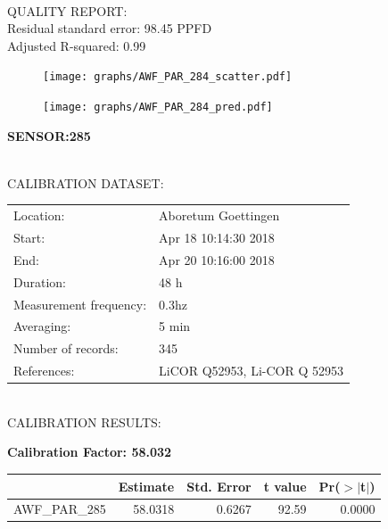 \documentclass[oneside]{report}
\begin{document}
\hrulefill\\
QUALITY REPORT:\\
Residual standard error: 98.45 PPFD\\
Adjusted R-squared: 0.99



\begin{figure}[H]
  \centering
  \texttt{[image: graphs/AWF\_PAR\_284\_scatter.pdf]}
\end{figure}




\begin{figure}[H]
  \centering
  \texttt{[image: graphs/AWF\_PAR\_284\_pred.pdf]}
\end{figure}

\pagebreak


\begin{center}
\large{\textbf{SENSOR:285}}\\
\end{center}

\hrulefill\\
CALIBRATION DATASET:\\
\begin{table}[h!]
  \centering
  \label{tab:table1}
  \begin{tabular}{ll}
    Location: & Aboretum Goettingen\\ 
    
    
    Start:  & Apr 18 10:14:30 2018 \\
    End:   & Apr 20 10:16:00 2018\\ 
    Duration: & 48 h\\
    Measurement frequency: & 0.3hz\\
    Averaging:  &5 min\\
    Number of records: & 345 \\
    References: & LiCOR Q52953, Li-COR Q 52953 \\
  \end{tabular}
\end{table}

\hrulefill\\
CALIBRATION RESULTS:\\


\begin{center}
\textbf{\large{Calibration Factor: 58.032}}\\
\end{center}
\begin{table}[ht]
\centering
\begin{tabular}{rrrrr}
  \hline
 & Estimate & Std. Error & t value & Pr($>$$|$t$|$) \\ 
  \hline
AWF\_PAR\_285 & 58.0318 & 0.6267 & 92.59 & 0.0000 \\ 
   \hline
\end{tabular}
\end{table}
\end{document}
